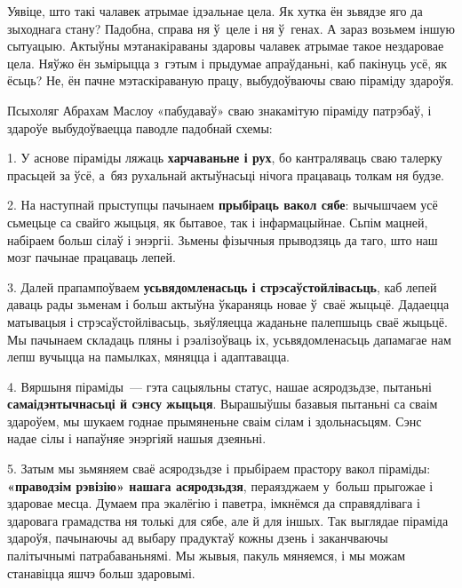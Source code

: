 Уявіце, што такі чалавек атрымае ідэальнае цела. Як хутка ён зьвядзе яго да зыходнага стану? Падобна, справа ня ў~целе і ня ў~генах. А зараз возьмем іншую сытуацыю. Актыўны мэтанакіраваны здаровы чалавек атрымае такое нездаровае цела. Няўжо ён зьмірыцца з~гэтым і прыдумае апраўданьні, каб пакінуць усё, як ёсьць? Не, ён пачне мэтаскіраваную працу, выбудоўваючы сваю піраміду здароўя.

Псыхоляг Абрахам Маслоу «пабудаваў» сваю знакамітую піраміду патрэбаў, і здароўе выбудоўваецца паводле падобнай схемы:

1. У аснове піраміды ляжаць \textbf{харчаваньне і рух}, бо кантраляваць сваю талерку прасьцей за ўсё, а~бяз рухальнай актыўнасьці нічога працаваць толкам ня будзе.

2. На наступнай прыступцы пачынаем \textbf{прыбіраць вакол сябе}: вычышчаем усё сьмецьце са свайго жыцьця, як бытавое, так і інфармацыйнае. Сьпім мацней, набіраем больш сілаў і энэргіі. Зьмены фізычныя прыводзяць да таго, што наш мозг пачынае працаваць лепей.

3. Далей прапампоўваем \textbf{усьвядомленасьць і стрэсаўстойлівасьць}, каб лепей даваць рады зьменам і больш актыўна ўкараняць новае ў~сваё жыцьцё. Дадаецца матывацыя і стрэсаўстойлівасьць, зьяўляецца жаданьне палепшыць сваё жыцьцё. Мы пачынаем складаць пляны і рэалізоўваць іх, усьвядомленасьць дапамагае нам лепш вучыцца на памылках, мяняцца і адаптавацца.

4. Вяршыня піраміды~--- гэта сацыяльны статус, нашае асяродзьдзе, пытаньні \textbf{самаідэнтычнасьці й сэнсу жыцьця}. Вырашыўшы базавыя пытаньні са сваім здароўем, мы шукаем годнае прымяненьне сваім сілам і здольнасьцям. Сэнс надае сілы і напаўняе энэргіяй нашыя дзеяньні.

5. Затым мы зьмяняем сваё асяродзьдзе і прыбіраем прастору вакол піраміды: \textbf{«праводзім рэвізію» нашага асяродзьдзя}, пераязджаем у~больш прыгожае і здаровае месца. Думаем пра экалёгію і паветра, імкнёмся да справядлівага і здаровага грамадства ня толькі для сябе, але й для іншых. Так выглядае піраміда здароўя, пачынаючы ад выбару прадуктаў кожны дзень і заканчваючы палітычнымі патрабаваньнямі. Мы жывыя, пакуль мяняемся, і мы можам станавіцца яшчэ больш здаровымі.


